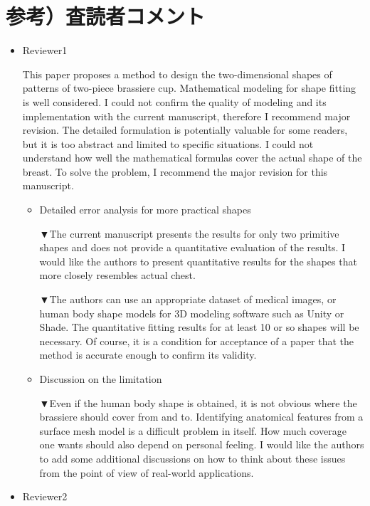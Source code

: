 \documentclass[11pt]{jsarticle}
\begin{document}
	\section{参考）査読者コメント}
		\begin{itemize}
			\item Reviewer1
			
			This paper proposes a method to design the two-dimensional shapes of patterns of two-piece brassiere cup. Mathematical modeling for shape fitting is well considered. I could not confirm the quality of modeling and its implementation with the current manuscript, therefore I recommend major revision.  The detailed formulation is potentially valuable for some readers, but it is too abstract and limited to specific situations. I could not understand how well the mathematical formulas cover the actual shape of the breast. To solve the problem, I recommend the major revision for this manuscript. 
			
			\begin{itemize}
				\item Detailed error analysis for more practical shapes 
				
				▼The current manuscript presents the results for only two primitive shapes and does not provide a quantitative evaluation of the results. I would like the authors to present quantitative results for the shapes that more closely resembles actual chest.
				
				▼The authors can use an appropriate dataset of medical images, or human body shape models for 3D modeling software such as Unity or Shade. The quantitative fitting results for at least 10 or so shapes will be necessary. Of course, it is a condition for acceptance of a paper that the method is accurate enough to confirm its validity.
				
				\item Discussion on the limitation 
				
				▼Even if the human body shape is obtained, it is not obvious where the brassiere should cover from and to. Identifying anatomical features from a surface mesh model is a difficult problem in itself. How much coverage one wants should also depend on personal feeling. I would like the authors to add some additional discussions on how to think about these issues from the point of view of real-world applications.
			\end{itemize}
			\item Reviewer2
			

\end{itemize}
\end{document}
